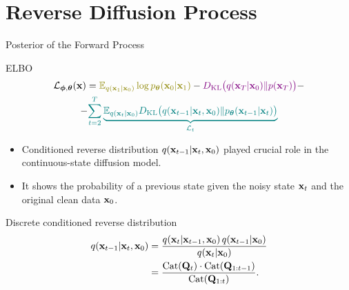 \documentclass{beamer}
\begin{document}
\section{Reverse Diffusion Process}
\begin{frame}{Posterior of the Forward Process}
	\begin{block}{ELBO}
		\vspace{-0.7cm}
		\begin{multline*}
            \cL_{\bphi, \btheta}(\bx) =  {\color{olive}\bbE_{q(\bx_1 | \bx_0)} \log \pt(\bx_0 | \bx_1)} - {\color{violet}\KL\bigl(q(\bx_T | \bx_0) \| p(\bx_T)\bigr)} - \\
            - {\color{teal}\sum_{t=2}^T \underbrace{ \bbE_{q(\bx_t | \bx_0)} \KL \bigl(q(\bx_{t-1} | \bx_t, \bx_0) \| \pt(\bx_{t-1} | \bx_t)\bigr)}_{\cL_t}}
        \end{multline*}
		\vspace{-0.7cm}
	\end{block}
	\eqpause
	\begin{itemize}
		\item Conditioned reverse distribution $q(\mathbf{x}_{t-1} | \mathbf{x}_t, \mathbf{x}_0)$ played crucial role in the continuous-state diffusion model.
		\item It shows the probability of a previous state given the noisy state $\mathbf{x}_t$ and the original clean data $\mathbf{x}_0$.
	\end{itemize}
	\eqpause
	\begin{block}{Discrete conditioned reverse distribution}
		\vspace{-0.7cm}
		\begin{align*}
			q(\mathbf{x}_{t-1} | \mathbf{x}_t, \mathbf{x}_0)
			&= \frac{q(\mathbf{x}_t | \mathbf{x}_{t-1}, \mathbf{x}_0)\, q(\mathbf{x}_{t-1} | \mathbf{x}_0)}
			        {q(\mathbf{x}_t | \mathbf{x}_0)} \\
			&= \frac{\operatorname{Cat}(\mathbf{Q}_t) \cdot \operatorname{Cat}(\mathbf{Q}_{1:t-1})}{\operatorname{Cat}(\mathbf{Q}_{1:t})}.
		\end{align*}
	\end{block}
\end{frame}
\end{document}
